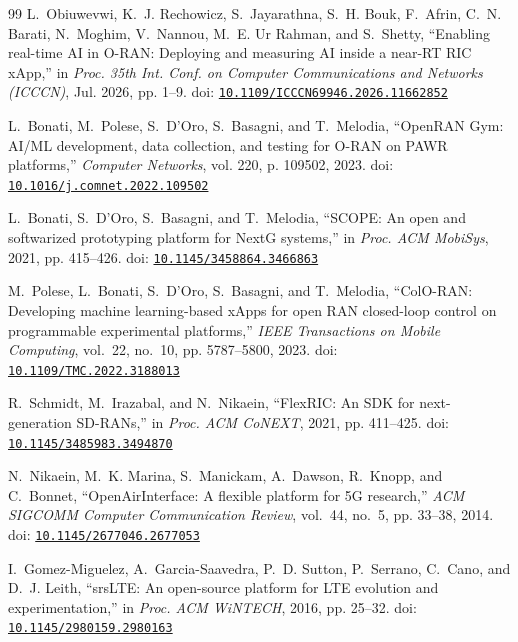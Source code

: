 \begin{thebibliography}{99}
L.~Obiuwevwi, K.~J. Rechowicz, S.~Jayarathna, S.~H. Bouk, F.~Afrin, C.~N.
  Barati, N.~Moghim, V.~Nannou, M.~E. {Ur Rahman}, and S.~Shetty, ``Enabling
  real-time {AI} in {O-RAN}: Deploying and measuring {AI} inside a near-{RT}
  {RIC} {xApp},'' in \emph{Proc. 35th Int. Conf. on Computer Communications and
  Networks (ICCCN)}, Jul. 2026, pp. 1--9. doi:
  \href{https://doi.org/10.1109/ICCCN69946.2026.11662852}{\nolinkurl{10.1109/ICCCN69946.2026.11662852}}

L.~Bonati, M.~Polese, S.~D'Oro, S.~Basagni, and T.~Melodia, ``{OpenRAN Gym}:
  {AI/ML} development, data collection, and testing for {O-RAN} on {PAWR}
  platforms,'' \emph{Computer Networks}, vol. 220, p. 109502, 2023. doi:
  \href{https://doi.org/10.1016/j.comnet.2022.109502}{\nolinkurl{10.1016/j.comnet.2022.109502}}

L.~Bonati, S.~D'Oro, S.~Basagni, and T.~Melodia, ``{SCOPE}: An open and
  softwarized prototyping platform for {NextG} systems,'' in \emph{Proc. ACM
  MobiSys}, 2021, pp. 415--426. doi:
  \href{https://doi.org/10.1145/3458864.3466863}{\nolinkurl{10.1145/3458864.3466863}}

M.~Polese, L.~Bonati, S.~D'Oro, S.~Basagni, and T.~Melodia, ``{ColO-RAN}:
  Developing machine learning-based {xApps} for open {RAN} closed-loop control
  on programmable experimental platforms,'' \emph{IEEE Transactions on Mobile
  Computing}, vol.~22, no.~10, pp. 5787--5800, 2023. doi:
  \href{https://doi.org/10.1109/TMC.2022.3188013}{\nolinkurl{10.1109/TMC.2022.3188013}}

R.~Schmidt, M.~Irazabal, and N.~Nikaein, ``{FlexRIC}: An {SDK} for
  next-generation {SD-RANs},'' in \emph{Proc. ACM CoNEXT}, 2021, pp. 411--425.
  doi:
  \href{https://doi.org/10.1145/3485983.3494870}{\nolinkurl{10.1145/3485983.3494870}}

N.~Nikaein, M.~K. Marina, S.~Manickam, A.~Dawson, R.~Knopp, and C.~Bonnet,
  ``{OpenAirInterface}: A flexible platform for {5G} research,'' \emph{ACM
  SIGCOMM Computer Communication Review}, vol.~44, no.~5, pp. 33--38, 2014.
  doi:
  \href{https://doi.org/10.1145/2677046.2677053}{\nolinkurl{10.1145/2677046.2677053}}

I.~Gomez-Miguelez, A.~Garcia-Saavedra, P.~D. Sutton, P.~Serrano, C.~Cano, and
  D.~J. Leith, ``{srsLTE}: An open-source platform for {LTE} evolution and
  experimentation,'' in \emph{Proc. ACM WiNTECH}, 2016, pp. 25--32. doi:
  \href{https://doi.org/10.1145/2980159.2980163}{\nolinkurl{10.1145/2980159.2980163}}


\end{thebibliography}
